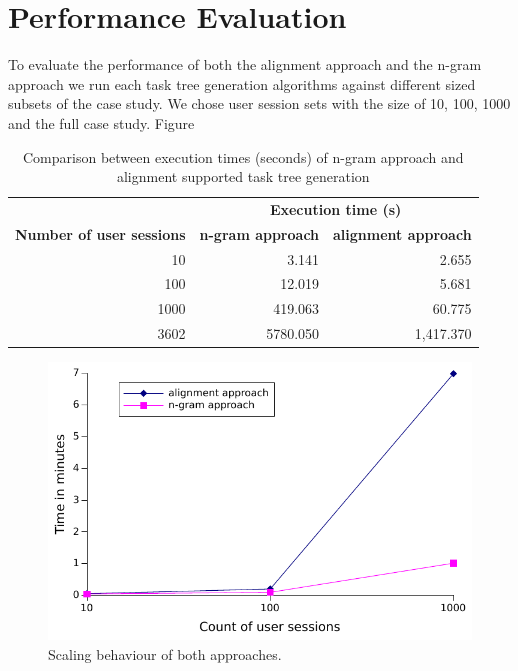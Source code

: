 \section{Performance Evaluation}
To evaluate the performance of both the alignment approach and the n-gram approach we run each task tree generation algorithms against different sized subsets of the case study.
We chose user session sets with the size of 10, 100, 1000 and the full case study. Figure

\begin{table}[h]
	\centering
	\begin{tabular}{ r r r }
		\toprule
		& \multicolumn{2}{c}{\textbf{Execution time (s)}} \\
		\cmidrule{2-3}
		\textbf{Number of user sessions} & \textbf{n-gram approach} & \textbf{alignment approach} \\
		\midrule
		10 	& 3.141 	& 2.655 \\
		100 	& 12.019 	& 5.681 \\
		1000 	& 419.063 	& 60.775 \\
		\midrule
		3602 	& 5780.050 	& 1,417.370 \\
		\bottomrule
	\end{tabular}
	\caption{Comparison between execution times (seconds) of n-gram approach and alignment supported task tree generation}
	\label{tab:comparisontasktreegenerations}
\end{table}


 \begin{figure}[h]
	\includegraphics{chapters/casestudy/performance.pdf}
	\caption{Scaling behaviour of both approaches.}
	\label{fig:performance}
\end{figure}
